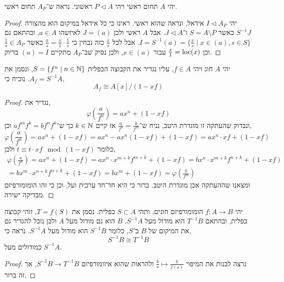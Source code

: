 \question{}
יהי $A$ תחום ראשי ויהי $P \triangleleft A$ ראשוני.
נראה ש־$A_P$ תחום ראשי.
\begin{proof}
	יהי $I \triangleleft A_P$ אידאל, ונראה שהוא ראשי.
	ראינו כי כל אידאל במיקום הוא מהצורה $S^{-1} J$ כאשר $S = A \setminus P$ ו־$J \triangleleft A$.
	אבל $A$ ראשי ולכן $J = (a)$ לאיזשהו $a \in A$, ובהתאם גם $I = S^{-1} (a) = \{ \frac{x}{s} \mid x \in (a), s \in S \}$.
	אבל לכל $\frac{x}{s}$ כזה נבחין כי $\frac{x}{s} = \frac{x}{1} \cdot \frac{1}{s}$ כאשר $\frac{1}{s} \in A_P$ וכן $\frac{x}{1} = \operatorname{loc}(x)$ עבור $x \in (a)$, ולכן נסיק שב־$A_P$ מתקיים $(a) = I$ בדיוק.
\end{proof}

\question{}
יהי $A$ חוג ויהי $f \in A$, עליו נגדיר את הקבוצה הכפלית $S = \{ f^n \mid n \in \mathbb{N} \}$, ונסמן את $A_f = S^{-1} A$.
נוכיח כי,
\[
	A_f
	\cong A[x] / (1 - x f)
\]
\begin{proof}
	נגדיר את,
	\[
		\varphi(\frac{a}{f^n})
		= a x^n + (1 - x f)
	\]
	ונבדוק שהעתקה זו מוגדרת היטב, נניח ש־$\frac{a}{f^n} = \frac{b}{f^m}$ אז קיים $k \in \mathbb{N}$ כך ש־$a f^m f^k = b f^n f^k$ וכן,
	\[
		\varphi(\frac{a}{f^n})
		= a x^n + (1 - x f)
		= a x^n - a x^n (1 - x f) + (1 - x f)
		= a x^n \cdot x f + (1 - x f)
	\]
	כלומר $t \equiv t \cdot x f \mod (1 - x f)$ ולכן,
	\begin{multline*}
		\varphi(\frac{a}{f^n})
		= a x^n + (1 - x f)
		= a x^n \cdot x^{m + k} f^{m + k} + (1 - x f)
		= b x^n \cdot x^{m + k} f^{n + k} + (1 - x f) \\
		= b x^m \cdot x^{n + k} f^{n + k} + (1 - x f)
		= b x^m + (1 - x f)
		= \varphi(\frac{b}{f^m})
	\end{multline*}
	ומצאנו שההעתקה אכן מוגדרת היטב.
	ברור כי היא חד־חד ערכית ועל, וכן כי זהו הומומורפיזם מבדיקה ישירה.
\end{proof}

\question{}
יהי $f : A \to B$ הומומורפיזם חוגים, ותהי $S \subset A$ כפלית.
נסמן את $T = f(S)$, זוהי קבוצה כפלית, ובהתאם $T^{-1} B$ הוא מודול מעל $S^{-1} A$.
$B$ הוא גם מודול מעל $A$ ולכן נוכל להגדיר גם את המיקום של $B$ ב־$S$, כלומר $S^{-1} B$ הוא מודול מעל $S^{-1} A$.
נראה כי,
\[
	S^{-1} B
	\cong T^{-1} B
\]
כמודולים מעל $S^{-1} A$.
\begin{proof}
	נרצה לבנות את המיפוי $\frac{b}{s} \mapsto \frac{b}{f(s)}$ ולהראות שהוא איזומורפיזם $S^{-1} B \to T^{-1} B$, אך זה ברור.
\end{proof}

